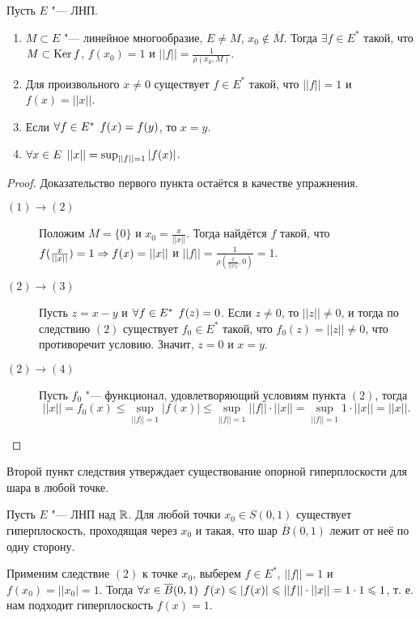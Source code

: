 \documentclass[main]{subfiles}
\begin{document}
\begin{corollary}
  Пусть $E$ "--- ЛНП.
  \begin{enumerate}
    \item $M \subset E$ "--- линейное многообразие, $E \ne M$,
      $x_0 \notin \overline{M}$. Тогда $\exists f \in E^*$ такой,
      что $M \subset \operatorname{Ker} f $, $f(x_0) = 1$ и $||f|| = \frac{1}{\rho(x_0, M)}$.
    \item Для произвольного $x \ne 0$ существует $f \in E^*$ такой, что
      \( ||f|| = 1 \) и $f(x) = ||x||$.
    \item Если $\forall {f \in E^*} \; \, f(x) = f(y)$, то $x = y$.
    \item $\forall {x \in E} \; \, ||x|| = \sup_{||f|| = 1} |f(x)|$.
  \end{enumerate}
\end{corollary}
\begin{proof}
  Доказательство первого пункта остаётся в качестве упражнения.

  \begin{description}
    \item[$(1) \to (2)$]
      Положим $M = \{ 0 \}$ и $x_0 = \frac{x}{||x||}$. Тогда
      найдётся $f$ такой, что $f(\frac{x}{||x||}) = 1 \Rightarrow
      f(x) = ||x||$ и $||f|| = \frac{1}{\rho(\frac{x}{||x||}, {0})} = 1$.
    \item[$(2) \to (3)$]
      Пусть $z = x - y$ и $\forall {f \in E^*} \; \, f(z) = 0$.
      Если $z \ne 0$, то $||z|| \ne 0$, и тогда по следствию $(2)$
      существует $f_0 \in E^*$ такой, что $f_0(z) = ||z|| \ne 0$,
      что противоречит условию. Значит, $z = 0$ и $x = y$.
    \item[$(2) \to (4)$]
      Пусть $f_0$ "--- функционал, удовлетворяющий условиям пункта $(2)$,
      тогда
      \[ ||x|| = f_0(x) \le \sup_{||f|| = 1} |f(x)| \le
	\sup_{||f|| = 1} ||f|| \cdot ||x|| =
      \sup_{||f|| = 1} 1 \cdot ||x|| = ||x||. \]
  \end{description}
\end{proof}

\begin{remark}
  Второй пункт следствия утверждает существование опорной гиперплоскости для шара в любой точке.

  Пусть $E$ "--- ЛНП над $\mathbb{R}$.
  Для любой точки $x_0 \in S(0, 1)$ существует гиперплоскость,
  проходящая через $x_0$ и такая, что шар $\overline{B}(0, 1)$
  лежит от неё по одну сторону.

  Применим следствие $(2)$ к точке $x_0$, выберем $f \in E^*$,
  $||f|| = 1$ и $f(x_0) = ||x_0| = 1$. Тогда
  $\forall {x \in \overline{B}(0, 1)} \; \, f(x) \leqslant |f(x)| \leqslant
  ||f|| \cdot ||x|| = 1 \cdot 1 \leqslant 1$, т. е. нам подходит
  гиперплоскость $f(x) = 1$.
\end{remark}
\end{document}
